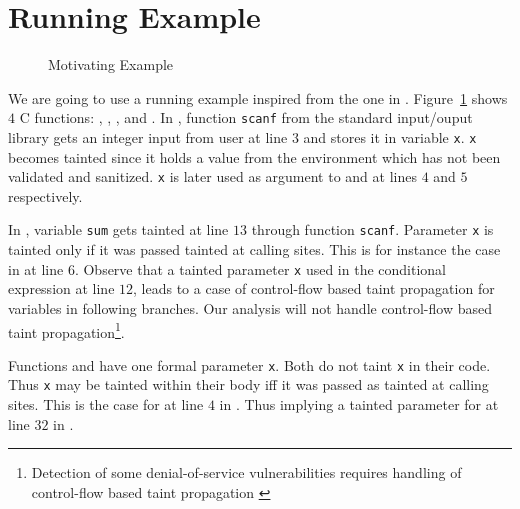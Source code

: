 \section{Running Example}\label{sec:example} 

\begin{figure}[!ht]
\centering
{}
\caption{Motivating Example}
\label{fig:sample}
\end{figure}

We are going to use a running example inspired from
the one in \cite{Dimitru:2009:STAC}.
Figure~\ref{fig:sample} shows $4$ C functions:
\main{}, \compute{}, \odd{}, and \even{}.
In \main{}, function \texttt{scanf} from the standard input/ouput
library gets an integer input from user at line $3$
and stores it in variable \texttt{x}. \texttt{x} 
becomes tainted since it holds a value from
the environment which has not been validated and
sanitized.
\texttt{x} is later used as argument to \even{} and \odd{}
at lines $4$ and $5$ respectively.

In \compute{}, variable \texttt{sum} gets tainted at
line $13$ through function \texttt{scanf}. Parameter
\texttt{x} is tainted only if it was passed tainted
at calling sites.
This is for instance the case in \main{} at line $6$.
Observe that a tainted parameter \texttt{x} used in
the conditional expression at line $12$, leads to
a case of control-flow based taint propagation for
variables in following branches.
Our analysis will not handle control-flow based taint
propagation\footnote{Detection of some denial-of-service
vulnerabilities requires handling of control-flow based
taint propagation \cite{Chang:2009:ICS}}. 

Functions \even{} and \odd{} have one formal parameter
\texttt{x}. Both do not taint \texttt{x} in their code.
Thus \texttt{x} may be tainted within their body iff it was
passed as tainted at calling sites. This is the case
for \even{} at line $4$ in \main{}. Thus implying a tainted
parameter for \odd{} at line $32$ in \even{}.